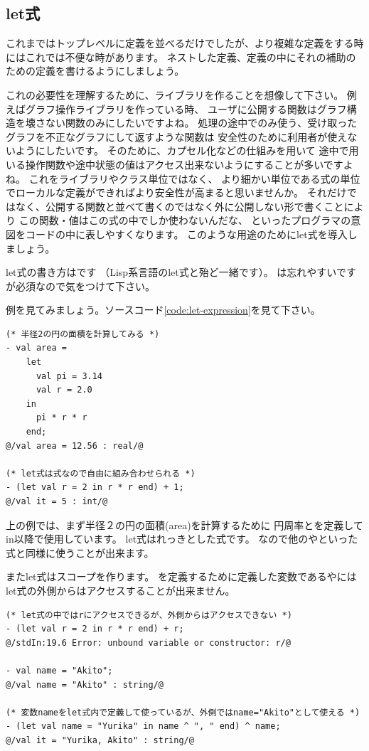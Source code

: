 \documentclass[11pt,a4paper]{article}
\begin{document}
\subsection{let式}
これまではトップレベルに定義を並べるだけでしたが、より複雑な定義をする時にはこれでは不便な時があります。
ネストした定義、定義の中にそれの補助のための定義を書けるようにしましょう。

これの必要性を理解するために、ライブラリを作ることを想像して下さい。
例えばグラフ操作ライブラリを作っている時、
ユーザに公開する関数はグラフ構造を壊さない関数のみにしたいですよね。
処理の途中でのみ使う、受け取ったグラフを不正なグラフにして返すような関数は
安全性のために利用者が使えないようにしたいです。
そのために、カプセル化などの仕組みを用いて
途中で用いる操作関数や途中状態の値はアクセス出来ないようにすることが多いですよね。
これをライブラリやクラス単位ではなく、
より細かい単位である式の単位でローカルな定義ができればより安全性が高まると思いませんか。
それだけではなく、公開する関数と並べて書くのではなく外に公開しない形で書くことにより
この関数・値はこの式の中でしか使わないんだな、
といったプログラマの意図をコードの中に表しやすくなります。
このような用途のためにlet式を導入しましょう。

let式の書き方はです
（Lisp系言語のlet式と殆ど一緒です）。
は忘れやすいですが必須なので気をつけて下さい。

例を見てみましょう。ソースコード\ref{code:let-expression}を見て下さい。

\begin{lstlisting}[caption=let式,label=code:let-expression]
(* 半径2の円の面積を計算してみる *)
- val area =
    let
      val pi = 3.14
      val r = 2.0
    in
      pi * r * r
    end;
@/val area = 12.56 : real/@

(* let式は式なので自由に組み合わせられる *)
- (let val r = 2 in r * r end) + 1;
@/val it = 5 : int/@
\end{lstlisting}

上の例では、まず半径２の円の面積(area)を計算するために
円周率とを定義してin以降で使用しています。
let式はれっきとした式です。
なので他のやといった式と同様に使うことが出来ます。

またlet式はスコープを作ります。
を定義するために定義した変数であるやには
let式の外側からはアクセスすることが出来ません。

\begin{lstlisting}[caption=let式のスコープ,label=code:let-scope]
(* let式の中ではrにアクセスできるが、外側からはアクセスできない *)
- (let val r = 2 in r * r end) + r;
@/stdIn:19.6 Error: unbound variable or constructor: r/@

- val name = "Akito";
@/val name = "Akito" : string/@

(* 変数nameをlet式内で定義して使っているが、外側ではname="Akito"として使える *)
- (let val name = "Yurika" in name ^ ", " end) ^ name;
@/val it = "Yurika, Akito" : string/@
\end{lstlisting}
\end{document}
